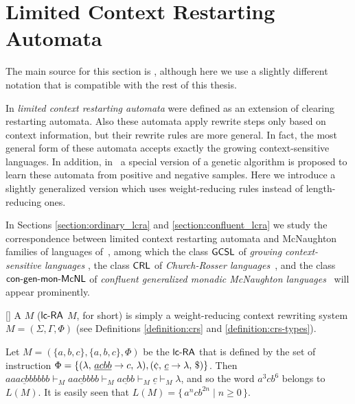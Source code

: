 \section{Limited Context Restarting Automata}\label{section:lcra}

The main source for this section is \cite{OCM13}, although here we use a slightly different notation that is compatible with the rest of this thesis.

In \cite{B11} \emph{limited context restarting automata} were defined as an extension of clearing restarting automata. Also these automata apply rewrite steps only based on context information, but their rewrite rules are more general. In fact, the most general form of these automata accepts exactly the growing context-sensitive languages. In addition, in~\cite{B11} a special version of a genetic algorithm is proposed to learn these automata from positive and negative samples. Here we introduce a slightly generalized version which uses weight-reducing rules instead of length-reducing ones.

In Sections \ref{section:ordinary_lcra} and \ref{section:confluent_lcra} we study the correspondence between limited context restarting automata and McNaughton families of languages of~\cite{Beaudry2003}, among which the class \index{$\GCSL$}$\GCSL$ of \emph{growing context-sensitive languages} \cite{Buntrock19981,DW86}, the class \index{$\CRL$}$\CRL$ of \emph{Church-Rosser languages}~\cite{MNO88}, and the class \index{$\congenmonMcNL$}$\congenmonMcNL$ of \emph{confluent generalized monadic McNaughton languages}~\cite{Leupold2011} will appear prominently.

\begin{definition}\label{DefLCRA}[\cite{OCM13}]
A  $M$ (\index{$\lcRA$}$\lcRA$ $M$, for short) is simply a weight-reducing context rewriting system $M=(\Sigma,\Gamma,\Phi)$ (see Definitions \ref{definition:crs} and \ref{definition:crs-types}).
\end{definition}

\begin{example}
Let $M=(\{a,b,c\},\{a,b,c\},\Phi)$ be the $\lcRA$ that is defined by the set of instruction $\Phi=\{\rarule{\lambda}{\underline{acbb}}{c}{\lambda},\rarule{\cent}{\underline{c}}{\lambda}{\$}\}$. Then $aa\underline{acbb}bbbb \vdash_M a\underline{acbb}bb \vdash_M \underline{acbb} \vdash_M \underline{c} \vdash_M \lambda$, and so the word $a^3cb^6$ belongs to $L(M)$. It is easily seen that $L(M) = \{\, a^ncb^{2n} \mid n \ge 0 \,\}$.
\end{example}

